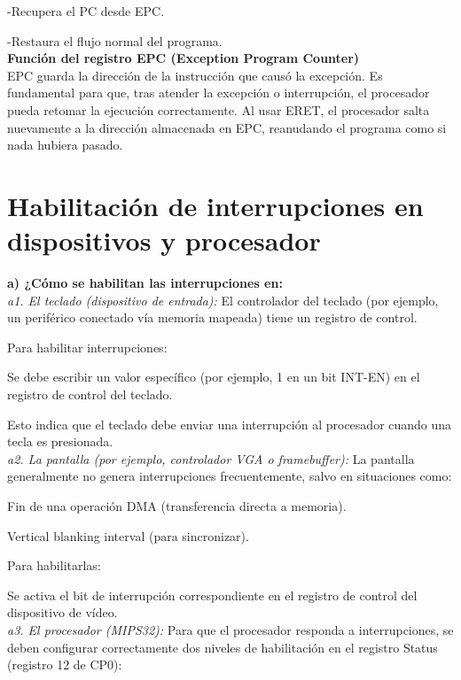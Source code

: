 \documentclass[]{article}
\begin{document}
-Recupera el PC desde EPC.

-Restaura el flujo normal del programa. \\

\textbf{ Función del registro EPC (Exception Program Counter)} \\
 
EPC guarda la dirección de la instrucción que causó la excepción. Es fundamental para que, tras atender la excepción o interrupción, el procesador pueda retomar la ejecución correctamente. Al usar ERET, el procesador salta nuevamente a la dirección almacenada en EPC, reanudando el programa como si nada hubiera pasado.

\section{Habilitación de interrupciones en dispositivos y procesador}

\textbf{a) ¿Cómo se habilitan las interrupciones en:} \\

 \textit{a1. El teclado (dispositivo de entrada):}
El controlador del teclado (por ejemplo, un periférico conectado vía memoria mapeada) tiene un registro de control.

Para habilitar interrupciones:

Se debe escribir un valor específico (por ejemplo, 1 en un bit INT-EN) en el registro de control del teclado.

Esto indica que el teclado debe enviar una interrupción al procesador cuando una tecla es presionada. \\

\textit{ a2. La pantalla (por ejemplo, controlador VGA o framebuffer):}
La pantalla generalmente no genera interrupciones frecuentemente, salvo en situaciones como:

Fin de una operación DMA (transferencia directa a memoria).

Vertical blanking interval (para sincronizar).

Para habilitarlas:

Se activa el bit de interrupción correspondiente en el registro de control del dispositivo de vídeo. \\

 \textit{a3. El procesador (MIPS32):}
 Para que el procesador responda a interrupciones, se deben configurar correctamente dos niveles de habilitación en el registro Status (registro 12 de CP0):
 
\end{document}
